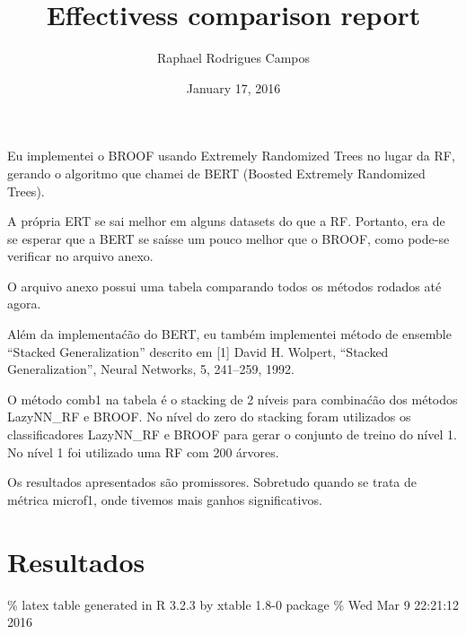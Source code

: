 \documentclass[]{article}
\title{Effectivess comparison report}
\author{Raphael Rodrigues Campos}
\date{January 17, 2016}
\begin{document}
\maketitle


Eu implementei o BROOF usando Extremely Randomized Trees no lugar da RF,
gerando o algoritmo que chamei de BERT (Boosted Extremely Randomized
Trees).

A própria ERT se sai melhor em alguns datasets do que a RF. Portanto,
era de se esperar que a BERT se saísse um pouco melhor que o BROOF, como
pode-se verificar no arquivo anexo.

O arquivo anexo possui uma tabela comparando todos os métodos rodados
até agora.

Além da implementaćão do BERT, eu também implementei método de ensemble
``Stacked Generalization'' descrito em {[}1{]} David H. Wolpert,
``Stacked Generalization'', Neural Networks, 5, 241--259, 1992.

O método comb1 na tabela é o stacking de 2 níveis para combinaćão dos
métodos LazyNN\_RF e BROOF. No nível do zero do stacking foram
utilizados os classificadores LazyNN\_RF e BROOF para gerar o conjunto
de treino do nível 1. No nível 1 foi utilizado uma RF com 200 árvores.

Os resultados apresentados são promissores. Sobretudo quando se trata de
métrica microf1, onde tivemos mais ganhos significativos.

\section{Resultados}\label{resultados}

\% latex table generated in R 3.2.3 by xtable 1.8-0 package \% Wed Mar 9
22:21:12 2016
\end{document}
